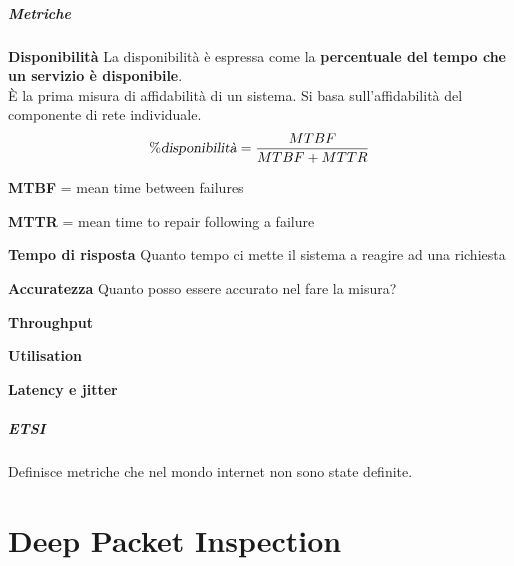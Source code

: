 \documentclass[10pt]{book}
\begin{document}
\paragraph{Metriche}
\begin{list}{}{}
	\item \textbf{Disponibilità} La disponibilità è espressa come la \textbf{percentuale del tempo che un servizio è disponibile}.\\
È la prima misura di affidabilità di un sistema. Si basa sull'affidabilità del componente di rete individuale.
$$ \% \textsl{disponibilità} = \frac{MTBF}{MTBF + MTTR} $$
\begin{list}{}{}
	\item \textbf{MTBF} = mean time between failures
	\item \textbf{MTTR} = mean time to repair following a failure
\end{list}
	\item \textbf{Tempo di risposta} Quanto tempo ci mette il sistema a reagire ad una richiesta
	\item \textbf{Accuratezza} Quanto posso essere accurato nel fare la misura?
	\item \textbf{Throughput}
	\item \textbf{Utilisation}
	\item \textbf{Latency e jitter}
\end{list}

\paragraph{ETSI} Definisce metriche che nel mondo internet non sono state definite.\\
\chapter{Deep Packet Inspection}
\end{document}
